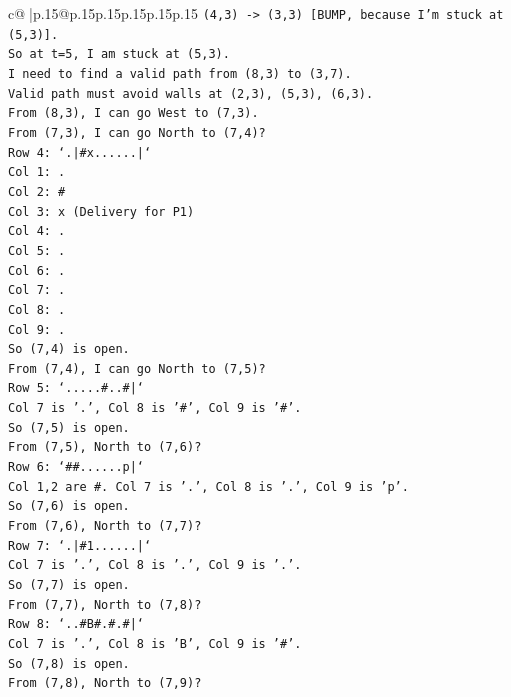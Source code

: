 \documentclass{article}
\begin{document}
{\begin{supertabular}{c@{$\;$}|p{.15\linewidth}@{}p{.15\linewidth}p{.15\linewidth}p{.15\linewidth}p{.15\linewidth}p{.15\linewidth}}
{{{\texttt{(4,3) {-}> (3,3) {[}BUMP, because I'm stuck at (5,3){]}.} \\
\texttt{So at t=5, I am stuck at (5,3).} \\
\texttt{I need to find a valid path from (8,3) to (3,7).} \\
\texttt{Valid path must avoid walls at (2,3), (5,3), (6,3).} \\
\texttt{From (8,3), I can go West to (7,3).} \\
\texttt{From (7,3), I can go North to (7,4)?} \\
\texttt{Row 4: `.|\#x......|`} \\
\texttt{Col 1: .} \\
\texttt{Col 2: \#} \\
\texttt{Col 3: x (Delivery for P1)} \\
\texttt{Col 4: .} \\
\texttt{Col 5: .} \\
\texttt{Col 6: .} \\
\texttt{Col 7: .} \\
\texttt{Col 8: .} \\
\texttt{Col 9: .} \\
\texttt{So (7,4) is open.} \\
\texttt{From (7,4), I can go North to (7,5)?} \\
\texttt{Row 5: `.....\#..\#|`} \\
\texttt{Col 7 is '.', Col 8 is '\#', Col 9 is '\#'.} \\
\texttt{So (7,5) is open.} \\
\texttt{From (7,5), North to (7,6)?} \\
\texttt{Row 6: `\#\#......p|`} \\
\texttt{Col 1,2 are \#. Col 7 is '.', Col 8 is '.', Col 9 is 'p'.} \\
\texttt{So (7,6) is open.} \\
\texttt{From (7,6), North to (7,7)?} \\
\texttt{Row 7: `.|\#1......|`} \\
\texttt{Col 7 is '.', Col 8 is '.', Col 9 is '.'.} \\
\texttt{So (7,7) is open.} \\
\texttt{From (7,7), North to (7,8)?} \\
\texttt{Row 8: `..\#B\#.\#.\#|`} \\
\texttt{Col 7 is '.', Col 8 is 'B', Col 9 is '\#'.} \\
\texttt{So (7,8) is open.} \\
\texttt{From (7,8), North to (7,9)?} \\
}}}
\end{supertabular}}
\end{document}
